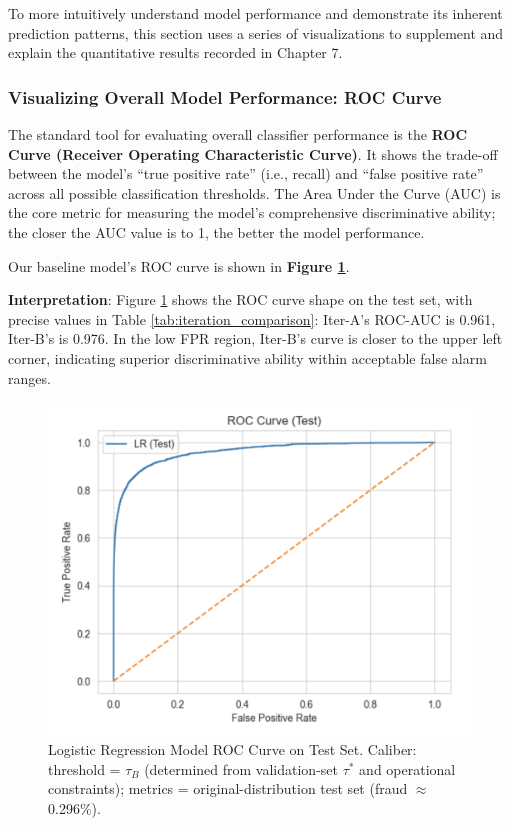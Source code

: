 \documentclass[sigplan,screen]{acmart}
\begin{document}
To more intuitively understand model performance and demonstrate its inherent prediction patterns, this section uses a series of visualizations to supplement and explain the quantitative results recorded in Chapter 7.

\subsubsection{Visualizing Overall Model Performance: ROC Curve}

The standard tool for evaluating overall classifier performance is the \textbf{ROC Curve (Receiver Operating Characteristic Curve)}. It shows the trade-off between the model's ``true positive rate'' (i.e., recall) and ``false positive rate'' across all possible classification thresholds. The Area Under the Curve (AUC) is the core metric for measuring the model's comprehensive discriminative ability; the closer the AUC value is to 1, the better the model performance.

Our baseline model's ROC curve is shown in \textbf{Figure \ref{fig:roc_curve}}.

\textbf{Interpretation}: Figure \ref{fig:roc_curve} shows the ROC curve shape on the test set, with precise values in Table \ref{tab:iteration_comparison}: Iter-A's ROC-AUC is 0.961, Iter-B's is 0.976. In the low FPR region, Iter-B's curve is closer to the upper left corner, indicating superior discriminative ability within acceptable false alarm ranges.

\begin{figure}[h!]
    \centering
    \includegraphics[width=0.9\columnwidth]{8.1.png}
    \caption{Logistic Regression Model ROC Curve on Test Set. Caliber: threshold = $\tau_B$ (determined from validation-set $\tau^*$ and operational constraints); metrics = original-distribution test set (fraud $\approx$ 0.296\%).}
    \label{fig:roc_curve}
\end{figure}
\end{document}
